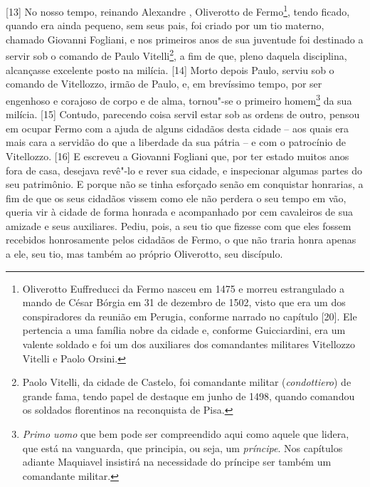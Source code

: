 {[}13{]} No nosso tempo, reinando Alexandre , Oliverotto de
Fermo\footnote{Oliverotto Euffreducci da Fermo nasceu em 1475 e morreu
  estrangulado a mando de César Bórgia em 31 de dezembro de 1502, visto
  que era um dos conspiradores da reunião em Perugia, conforme narrado
  no capítulo  {[}20{]}. Ele pertencia a uma família nobre da cidade
  e, conforme Guicciardini, era um valente soldado e foi um dos
  auxiliares dos comandantes militares Vitellozzo Vitelli e Paolo
  Orsini.}, tendo ficado, quando era ainda pequeno, sem seus pais, foi
criado por um tio materno, chamado Giovanni Fogliani, e nos primeiros
anos de sua juventude foi destinado a servir sob o comando de Paulo
Vitelli\footnote{Paolo Vitelli, da cidade de Castelo, foi comandante
  militar (\emph{condottiero}) de grande fama, tendo papel de destaque
  em junho de 1498, quando comandou os soldados florentinos na
  reconquista de Pisa.}, a fim de que, pleno daquela disciplina,
alcançasse excelente posto na milícia. {[}14{]} Morto depois Paulo,
serviu sob o comando de Vitellozzo, irmão de Paulo, e, em brevíssimo
tempo, por ser engenhoso e corajoso de corpo e de alma, tornou"-se o
primeiro homem\footnote{\emph{Primo uomo} que bem pode ser compreendido
  aqui como aquele que lidera, que está na vanguarda, que principia, ou
  seja, um \emph{príncipe}. Nos capítulos adiante Maquiavel insistirá na
  necessidade do príncipe ser também um comandante militar.} da sua
milícia. {[}15{]} Contudo, parecendo coisa servil estar sob as ordens de
outro, pensou em ocupar Fermo com a ajuda de alguns cidadãos desta
cidade -- aos quais era mais cara a servidão do que a liberdade da sua
pátria -- e com o patrocínio de Vitellozzo. {[}16{]} E escreveu a
Giovanni Fogliani que, por ter estado muitos anos fora de casa, desejava
revê"-lo e rever sua cidade, e inspecionar algumas partes do seu
patrimônio. E porque não se tinha esforçado senão em conquistar
honrarias, a fim de que os seus cidadãos vissem como ele não perdera o
seu tempo em vão, queria vir à cidade de forma honrada e acompanhado por
cem cavaleiros de sua amizade e seus auxiliares. Pediu, pois, a seu tio
que fizesse com que eles fossem recebidos honrosamente pelos cidadãos de
Fermo, o que não traria honra apenas a ele, seu tio, mas também ao
próprio Oliverotto, seu discípulo.

